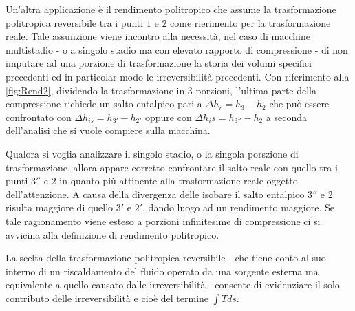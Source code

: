 Un'altra applicazione è il rendimento politropico che assume la trasformazione politropica reversibile tra i punti $1$ e $2$ come rierimento per la trasformazione reale. Tale assunzione viene incontro alla necessità, nel caso di macchine multistadio - o a singolo stadio ma con elevato rapporto di compressione - di non imputare ad una porzione di trasformazione la storia dei volumi specifici precedenti ed in particolar modo le irreversibilità precedenti. Con riferimento alla \ref{fig:Rend2}, dividendo la trasformazione in 3 porzioni, l'ultima parte della compressione richiede un salto entalpico pari a $\Delta h_r = h_3 - h_2$ che può essere confrontato con $\Delta h_{is} = h_{3'} - h_{2'}$ oppure con $\Delta h_is = h_{3''} - h_2$ a seconda dell'analisi che si vuole compiere sulla macchina.

Qualora si voglia analizzare il singolo stadio, o la singola porszione di trasformazione, allora appare corretto confrontare il salto reale con quello tra i punti $3''$ e $2$ in quanto più attinente alla trasformazione reale oggetto dell'attenzione. A causa della divergenza delle isobare il salto entalpico $3''$ e $2$ risulta maggiore di quello $3'$ e $2'$, dando luogo ad un rendimento maggiore. Se tale ragionamento viene esteso a porzioni infinitesime di compressione ci si avvicina alla definizione di rendimento politropico.

La scelta della trasformazione politropica reversibile - che tiene conto al suo interno di un riscaldamento del fluido operato da una sorgente esterna ma equivalente a quello causato dalle irreversibilità - consente di evidenziare il solo contributo delle irreversibilità e cioè del termine $\int Tds$.

